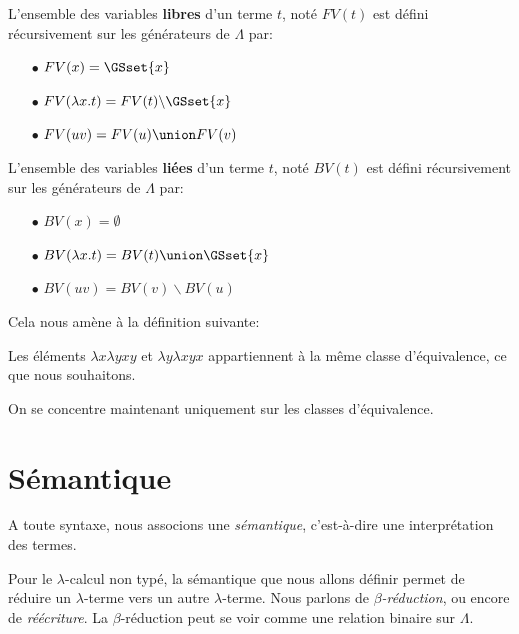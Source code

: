 \begin{definition} 
  L'ensemble des variables \textbf{libres} d'un terme $t$, noté $FV(t)$ est défini
  récursivement sur les générateurs de $\Lambda$ par:
  \begin{itemize}
  \item[$\bullet$] $FV(x) = \GSset{x}$
  \item[$\bullet$] $FV(\lambda x . t) = FV(t) \backslash \GSset{x}$
  \item[$\bullet$] $FV(u v) = FV(u) \union FV(v)$
  \end{itemize}
\end{definition}

\begin{definition} 
  L'ensemble des variables \textbf{liées} d'un terme $t$, noté $BV(t)$ est défini
  récursivement sur les générateurs de $\Lambda$ par:
  \begin{itemize}
  \item[$\bullet$] $BV(x) = \emptyset$
  \item[$\bullet$] $BV(\lambda x . t) = BV(t) \union \GSset{x}$
  \item[$\bullet$] $BV(u v) = BV(v) \backslash BV(u)$
  \end{itemize}
\end{definition}

Cela nous amène à la définition suivante:
\begin{definition} 
  
\end{definition}

Les éléments $\lambda x \lambda y xy$ et $\lambda y \lambda x yx$ appartiennent
à la même classe d'équivalence, ce que nous souhaitons.

On se concentre maintenant uniquement sur les classes d'équivalence.

\section{Sémantique}

A toute syntaxe, nous associons une \textit{sémantique}, c'est-à-dire une interprétation
des termes.

Pour le $\lambda$-calcul non typé, la sémantique que nous allons définir permet
de réduire un $\lambda$-terme vers un autre $\lambda$-terme. Nous parlons de
\textit{$\beta$-réduction}, ou encore de \textit{réécriture}. La
$\beta$-réduction peut se voir comme une relation binaire sur $\Lambda$.

